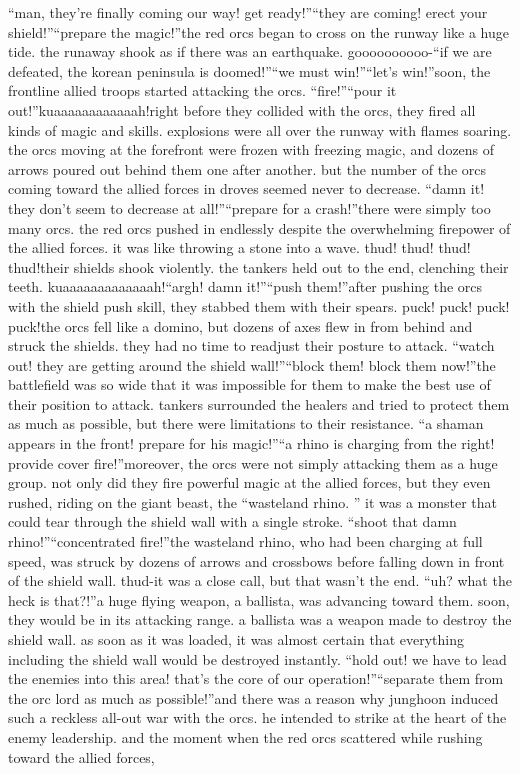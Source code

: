 “man, they’re finally coming our way! get ready!”“they are coming! erect your shield!”“prepare the magic!”the red orcs began to cross on the runway like a huge tide.
 the runaway shook as if there was an earthquake.
goooooooooo-“if we are defeated, the korean peninsula is doomed!”“we must win!”“let’s win!”soon, the frontline allied troops started attacking the orcs.
“fire!”“pour it out!”kuaaaaaaaaaaaah!right before they collided with the orcs, they fired all kinds of magic and skills.
explosions were all over the runway with flames soaring.
 the orcs moving at the forefront were frozen with freezing magic, and dozens of arrows poured out behind them one after another.
but the number of the orcs coming toward the allied forces in droves seemed never to decrease.
“damn it! they don’t seem to decrease at all!”“prepare for a crash!”there were simply too many orcs.
 the red orcs pushed in endlessly despite the overwhelming firepower of the allied forces.
 it was like throwing a stone into a wave.
thud! thud! thud! thud!their shields shook violently.
 the tankers held out to the end, clenching their teeth.
kuaaaaaaaaaaaaah!“argh! damn it!”“push them!”after pushing the orcs with the shield push skill, they stabbed them with their spears.
puck! puck! puck! puck!the orcs fell like a domino, but dozens of axes flew in from behind and struck the shields.
they had no time to readjust their posture to attack.
“watch out! they are getting around the shield wall!”“block them! block them now!”the battlefield was so wide that it was impossible for them to make the best use of their position to attack.
 tankers surrounded the healers and tried to protect them as much as possible, but there were limitations to their resistance.
“a shaman appears in the front! prepare for his magic!”“a rhino is charging from the right! provide cover fire!”moreover, the orcs were not simply attacking them as a huge group.
 not only did they fire powerful magic at the allied forces, but they even rushed, riding on the giant beast, the “wasteland rhino.
” it was a monster that could tear through the shield wall with a single stroke.
“shoot that damn rhino!”“concentrated fire!”the wasteland rhino, who had been charging at full speed, was struck by dozens of arrows and crossbows before falling down in front of the shield wall.
thud-it was a close call, but that wasn’t the end.
“uh? what the heck is that?!”a huge flying weapon, a ballista, was advancing toward them.
 soon, they would be in its attacking range.
a ballista was a weapon made to destroy the shield wall.
 as soon as it was loaded, it was almost certain that everything including the shield wall would be destroyed instantly.
“hold out! we have to lead the enemies into this area! that’s the core of our operation!”“separate them from the orc lord as much as possible!”and there was a reason why junghoon induced such a reckless all-out war with the orcs.
he intended to strike at the heart of the enemy leadership.
and the moment when the red orcs scattered while rushing toward the allied forces,

